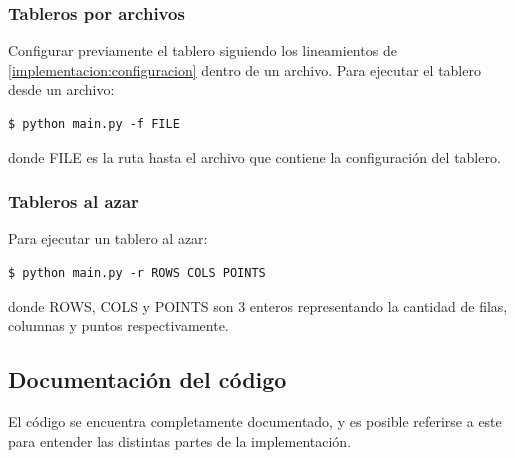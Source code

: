 \documentclass[letter,12pt]{article}
\begin{document}
\subsubsection{Tableros por archivos} \label{documentacion:ejecucion:archivos}

Configurar previamente el tablero siguiendo los lineamientos de \ref{implementacion:configuracion} dentro de un archivo. Para ejecutar el tablero desde un archivo: \par

\begin{verbatim}
$ python main.py -f FILE
\end{verbatim}

donde \textsc{FILE} es la ruta hasta el archivo que contiene la configuración del tablero. \par

\subsubsection{Tableros al azar} \label{documentacion:ejecucion:azar}

Para ejecutar un tablero al azar: \par

\begin{verbatim}
$ python main.py -r ROWS COLS POINTS
\end{verbatim}

donde \textsc{ROWS}, \textsc{COLS} y \textsc{POINTS} son 3 enteros representando la cantidad de filas, columnas y puntos respectivamente. \par

\subsection{Documentación del código}

El código se encuentra completamente documentado, y es posible referirse a este para entender las distintas partes de la implementación. \par
\end{document}
